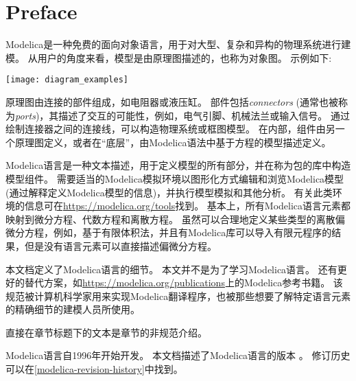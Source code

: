 \chapter*{Preface}\label{preface}
Modelica是一种免费的面向对象语言，用于对大型、复杂和异构的物理系统进行建模。
从用户的角度来看，模型是由原理图描述的，也称为对象图。
示例如下:
\begin{center}
\texttt{[image: diagram\_examples]}
\end{center}

原理图由连接的部件组成，如电阻器或液压缸。
部件包括\emph{connectors} (通常也被称为\emph{ports})，其描述了交互的可能性，例如，电气引脚、机械法兰或输入信号。 
通过绘制连接器之间的连接线，可以构造物理系统或框图模型。
在内部，组件由另一个原理图定义，或者在``底层''，由Modelica语法中基于方程的模型描述定义。

Modelica语言是一种文本描述，用于定义模型的所有部分，并在称为包的库中构造模型组件。
需要适当的Modelica模拟环境以图形化方式编辑和浏览Modelica模型(通过解释定义Modelica模型的信息)，并执行模型模拟和其他分析。
有关此类环境的信息可在\url{https://modelica.org/tools}找到。
基本上，所有Modelica语言元素都映射到微分方程、代数方程和离散方程。
虽然可以合理地定义某些类型的离散偏微分方程，例如，基于有限体积法，并且有Modelica库可以导入有限元程序的结果，但是没有语言元素可以直接描述偏微分方程。

本文档定义了Modelica语言的细节。
本文并不是为了学习Modelica语言。
还有更好的替代方案，如\url{https://modelica.org/publications}上的Modelica参考书籍。
该规范被计算机科学家用来实现Modelica翻译程序，也被那些想要了解特定语言元素的精确细节的建模人员所使用。

直接在章节标题下的文本是章节的非规范介绍。

Modelica语言自1996年开始开发。
本文档描述了Modelica语言的版本\mlsversion{} 。
修订历史可以在\cref{modelica-revision-history}中找到。
